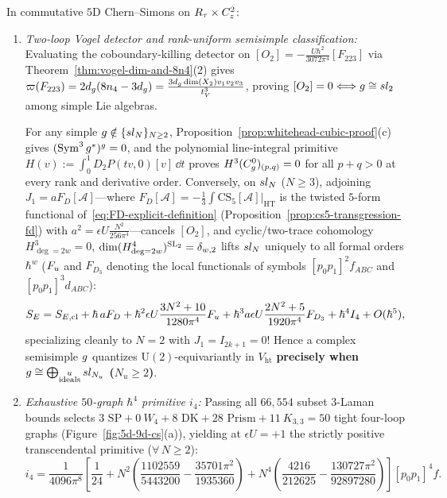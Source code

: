 \begin{theorem}
\label{thm:5d-cs-allorders}
In commutative $5\mathrm{D}$ Chern--Simons on $R_\tau\times C^2_z$:
\begin{enumerate}[label=(\arabic*),leftmargin=*]
  \item \emph{Two-loop Vogel detector and rank-uniform semisimple classification:} Evaluating the coboundary-killing detector on $[O_2] = -\frac{U\hbar^2}{3072\pi^4}[F_{223}]$ via Theorem~\ref{thm:vogel-dim-and-8n4}(2) gives $\varpi(F_{223}) = 2d_{g}(8n_4 - 3d_{g}) = \frac{3d_{g}\dim(X_2)v_1 v_2 v_3}{t_V^3}$, proving $[O_2] = 0 \Longleftrightarrow g \cong sl_2$ among simple Lie algebras.

  For any simple $g \notin \{sl_N\}_{N\ge 2}$, Proposition~\ref{prop:whitehead-cubic-proof}(c) gives $(\operatorname{Sym}^3g^*)^{g} = 0$, and the polynomial line-integral primitive $H(v) := \int_0^1 D_2 P(tv,0)[v]\,\dd t$ proves $H^3(C^0_{g})_{(p,q)} = 0$ for all $p+q > 0$ at every rank and derivative order. Conversely, on $sl_N$ ($N \ge 3$), adjoining $J_1 = a F_D[\mathcal{A}]$---where $F_D[\mathcal{A}] = -\frac{1}{3}\int\mathrm{CS}_5[\mathcal{A}]|_{\mathrm{HT}}$ is the twisted $5$-form functional of~\eqref{eq:FD-explicit-definition} (Proposition~\ref{prop:cs5-transgression-fd}) with $a^2 = \epsilon U\frac{N^2}{256\pi^4}$---cancels $[O_2]$, and cyclic/two-trace cohomology $H^3_{\deg=2w} = 0$, $\dim(H^4_{\deg=2w})^{\operatorname{SL}_2} = \delta_{w,2}$ lifts $sl_N$ uniquely to all formal orders $\hbar^w$ ($F_{u}$ and $F_{D_3}$ denoting the local functionals of symbols $[p_0 p_1]^2 f_{ABC}$ and $[p_0 p_1]^3 d_{ABC}$):
  \begin{equation}
  \label{eq:5d-cs-action-thru-h4}
  S_E = S_{E,\mathrm{cl}} + \hbar\,a F_D + \hbar^2\epsilon U\frac{3N^2+10}{1280\pi^4}F_{u} + \hbar^3 a\epsilon U\frac{2N^2+5}{1920\pi^4}F_{D_3} + \hbar^4 I_4 + O(\hbar^5),
  \end{equation}
  specializing cleanly to $N = 2$ with $J_1 = I_{2k+1} = 0$! Hence a complex semisimple $g$ quantizes $\mathrm{U}(2)$-equivariantly in $V_{\mathrm{ht}}$ \textbf{precisely when $g \cong \bigoplus_{\substack{u\\\mathrm{ideals}}}sl_{N_u}$ ($N_u \ge 2$)}.

  \item \emph{Exhaustive $50$-graph $\hbar^4$ primitive $i_4$:} Passing all $66{,}554$ subset $3$-Laman bounds selects $3\text{ SP} + 0\ W_4 + 8\text{ DK} + 28\text{ Prism} + 11\ K_{3,3} = 50$ tight four-loop graphs (Figure~\ref{fig:5d-9d-cs}(a)), yielding at $\epsilon U = +1$ the strictly positive transcendental primitive ($\forall\,N \ge 2$):
  \begin{equation}
  \label{eq:i4-5d-cs}
  i_4 = \frac{1}{4096\pi^8}\!\left[\frac{1}{24} + N^2\!\left(\frac{1102559}{5443200} - \frac{35701\pi^2}{1935360}\right) + N^4\!\left(\frac{4216}{212625} - \frac{130727\pi^2}{92897280}\right)\right][p_0 p_1]^4 f.
  \end{equation}


\end{enumerate}
\end{theorem}
